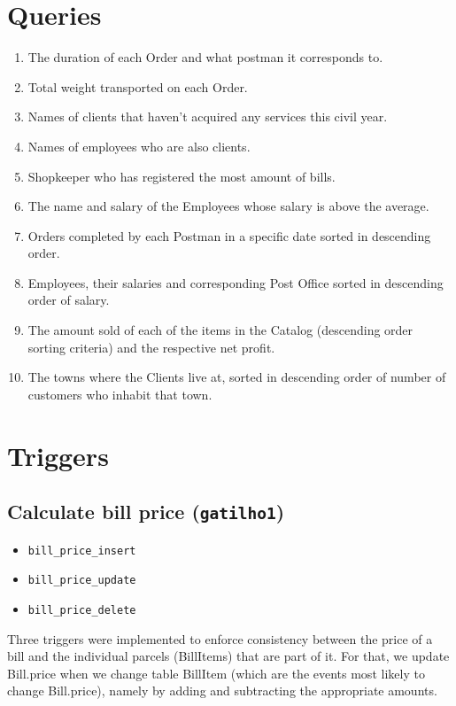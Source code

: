 \documentclass{report}[a4paper]
\theoremstyle{remark}
\begin{document}
\chapter{Queries}

\begin{enumerate}
    \item The duration of each Order and what postman it corresponds to.
    \item Total weight transported on each Order.
    \item Names of clients that haven't acquired any services this civil year.
    \item Names of employees who are also clients.
    \item Shopkeeper who has registered the most amount of bills.
    \item The name and salary of the Employees whose salary is above the average.
    \item Orders completed by each Postman in a specific date sorted in descending order.
    \item Employees, their salaries and corresponding Post Office sorted in descending order of salary.
    \item The amount sold of each of the items in the Catalog (descending order sorting criteria) and the respective net profit.
    \item The towns where the Clients live at, sorted in descending order of number of customers who inhabit that town.
\end{enumerate}

\chapter{Triggers}
\section{Calculate bill price (\texttt{gatilho1})}
\begin{itemize}
    \item \texttt{bill\_price\_insert}
    \item \texttt{bill\_price\_update}
    \item \texttt{bill\_price\_delete}
\end{itemize}
Three triggers were implemented to enforce consistency between the price of a bill and the individual parcels (BillItems) that are part of it. For that, we update Bill.price when we change table BillItem (which are the events most likely to change Bill.price), namely by adding and subtracting the appropriate amounts.
\end{document}
